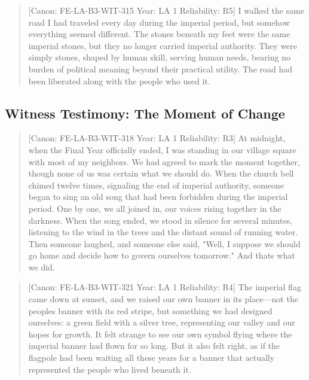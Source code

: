 \begin{quote}
{[}Canon: FE-LA-B3-WIT-315 \textbar{} Year: LA 1 \textbar{} Reliability:
R5{]} I walked the same road I had traveled every day during the
imperial period, but somehow everything seemed different. The stones
beneath my feet were the same imperial stones, but they no longer
carried imperial authority. They were simply stones, shaped by human
skill, serving human needs, bearing no burden of political meaning
beyond their practical utility. The road had been liberated along with
the people who used it.
\end{quote}

\subsection{Witness Testimony: The Moment of
Change}\label{witness-testimony-the-moment-of-change}

\begin{quote}
{[}Canon: FE-LA-B3-WIT-318 \textbar{} Year: LA 1 \textbar{} Reliability:
R3{]} At midnight, when the Final Year officially ended, I was standing
in our village square with most of my neighbors. We had agreed to mark
the moment together, though none of us was certain what we should do.
When the church bell chimed twelve times, signaling the end of imperial
authority, someone began to sing an old song that had been forbidden
during the imperial period. One by one, we all joined in, our voices
rising together in the darkness. When the song ended, we stood in
silence for several minutes, listening to the wind in the trees and the
distant sound of running water. Then someone laughed, and someone else
said, "Well, I suppose we should go home and decide how to govern
ourselves tomorrow." And that\textquotesingle s what we did.
\end{quote}

\begin{quote}
{[}Canon: FE-LA-B3-WIT-321 \textbar{} Year: LA 1 \textbar{} Reliability:
R4{]} The imperial flag came down at sunset, and we raised our own
banner in its place---not the people\textquotesingle s banner with its
red stripe, but something we had designed ourselves: a green field with
a silver tree, representing our valley and our hopes for growth. It felt
strange to see our own symbol flying where the imperial banner had flown
for so long. But it also felt right, as if the flagpole had been waiting
all these years for a banner that actually represented the people who
lived beneath it.
\end{quote}


